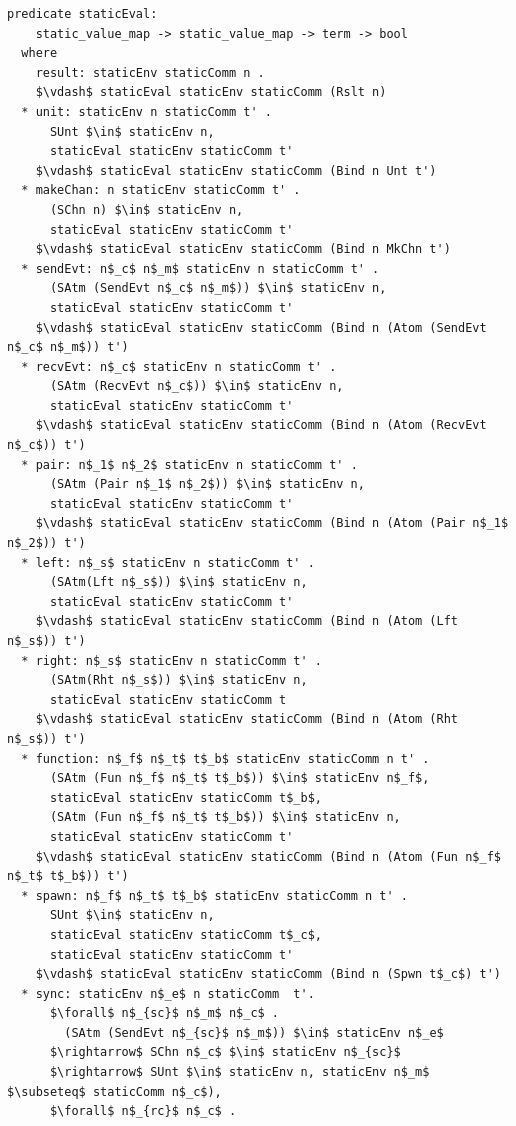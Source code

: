 \documentclass[letterpaper, 11pt]{extarticle}
\begin{document}
\begin{lstlisting}[language=logic, mathescape]
  predicate staticEval:
    static_value_map -> static_value_map -> term -> bool
  where
    result: staticEnv staticComm n .
    $\vdash$ staticEval staticEnv staticComm (Rslt n)
  * unit: staticEnv n staticComm t' .
      SUnt $\in$ staticEnv n,
      staticEval staticEnv staticComm t'
    $\vdash$ staticEval staticEnv staticComm (Bind n Unt t')
  * makeChan: n staticEnv staticComm t' .
      (SChn n) $\in$ staticEnv n,
      staticEval staticEnv staticComm t'
    $\vdash$ staticEval staticEnv staticComm (Bind n MkChn t')
  * sendEvt: n$_c$ n$_m$ staticEnv n staticComm t' .
      (SAtm (SendEvt n$_c$ n$_m$)) $\in$ staticEnv n,
      staticEval staticEnv staticComm t' 
    $\vdash$ staticEval staticEnv staticComm (Bind n (Atom (SendEvt n$_c$ n$_m$)) t')
  * recvEvt: n$_c$ staticEnv n staticComm t' . 
      (SAtm (RecvEvt n$_c$)) $\in$ staticEnv n,
      staticEval staticEnv staticComm t'
    $\vdash$ staticEval staticEnv staticComm (Bind n (Atom (RecvEvt n$_c$)) t')
  * pair: n$_1$ n$_2$ staticEnv n staticComm t' .
      (SAtm (Pair n$_1$ n$_2$)) $\in$ staticEnv n,
      staticEval staticEnv staticComm t'
    $\vdash$ staticEval staticEnv staticComm (Bind n (Atom (Pair n$_1$ n$_2$)) t')
  * left: n$_s$ staticEnv n staticComm t' .
      (SAtm(Lft n$_s$)) $\in$ staticEnv n,
      staticEval staticEnv staticComm t' 
    $\vdash$ staticEval staticEnv staticComm (Bind n (Atom (Lft n$_s$)) t')
  * right: n$_s$ staticEnv n staticComm t' .
      (SAtm(Rht n$_s$)) $\in$ staticEnv n, 
      staticEval staticEnv staticComm t
    $\vdash$ staticEval staticEnv staticComm (Bind n (Atom (Rht n$_s$)) t')
  * function: n$_f$ n$_t$ t$_b$ staticEnv staticComm n t' .
      (SAtm (Fun n$_f$ n$_t$ t$_b$)) $\in$ staticEnv n$_f$, 
      staticEval staticEnv staticComm t$_b$, 
      (SAtm (Fun n$_f$ n$_t$ t$_b$)) $\in$ staticEnv n, 
      staticEval staticEnv staticComm t'
    $\vdash$ staticEval staticEnv staticComm (Bind n (Atom (Fun n$_f$ n$_t$ t$_b$)) t')
  * spawn: n$_f$ n$_t$ t$_b$ staticEnv staticComm n t' .
      SUnt $\in$ staticEnv n, 
      staticEval staticEnv staticComm t$_c$, 
      staticEval staticEnv staticComm t'
    $\vdash$ staticEval staticEnv staticComm (Bind n (Spwn t$_c$) t')
  * sync: staticEnv n$_e$ n staticComm  t'.
      $\forall$ n$_{sc}$ n$_m$ n$_c$ . 
        (SAtm (SendEvt n$_{sc}$ n$_m$)) $\in$ staticEnv n$_e$
      $\rightarrow$ SChn n$_c$ $\in$ staticEnv n$_{sc}$ 
      $\rightarrow$ SUnt $\in$ staticEnv n, staticEnv n$_m$ $\subseteq$ staticComm n$_c$),
      $\forall$ n$_{rc}$ n$_c$ . 

\end{lstlisting}
\end{document}
